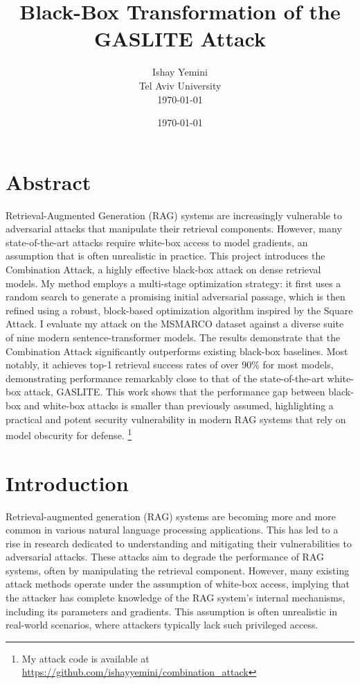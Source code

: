 \documentclass[a4paper, sigconf]{acmart}
\title{Black-Box Transformation of the GASLITE Attack}
\author{Ishay Yemini\\Tel Aviv University\\ \today}
\date{\today}
\begin{document}
\maketitle

\section*{Abstract}

Retrieval-Augmented Generation (RAG) systems are increasingly vulnerable to adversarial attacks that manipulate their retrieval components. However, many state-of-the-art attacks require white-box access to model gradients, an assumption that is often unrealistic in practice. This project introduces the Combination Attack, a highly effective black-box attack on dense retrieval models. My method employs a multi-stage optimization strategy: it first uses a random search to generate a promising initial adversarial passage, which is then refined using a robust, block-based optimization algorithm inspired by the Square Attack. I evaluate my attack on the MSMARCO \cite{bajaj2018} dataset against a diverse suite of nine modern sentence-transformer models. The results demonstrate that the Combination Attack significantly outperforms existing black-box baselines. Most notably, it achieves top-1 retrieval success rates of over 90\% for most models, demonstrating performance remarkably close to that of the state-of-the-art white-box attack, GASLITE. This work shows that the performance gap between black-box and white-box attacks is smaller than previously assumed, highlighting a practical and potent security vulnerability in modern RAG systems that rely on model obscurity for defense. \footnote{My attack code is available at \url{https://github.com/ishayyemini/combination_attack}}


\section{Introduction}

Retrieval-augmented generation (RAG) systems are becoming more and more common in various natural language processing applications. This has led to a rise in research dedicated to understanding and mitigating their vulnerabilities to adversarial attacks. These attacks aim to degrade the performance of RAG systems, often by manipulating the retrieval component. However, many existing attack methods operate under the assumption of white-box access, implying that the attacker has complete knowledge of the RAG system's internal mechanisms, including its parameters and gradients. This assumption is often unrealistic in real-world scenarios, where attackers typically lack such privileged access. 
\end{document}
